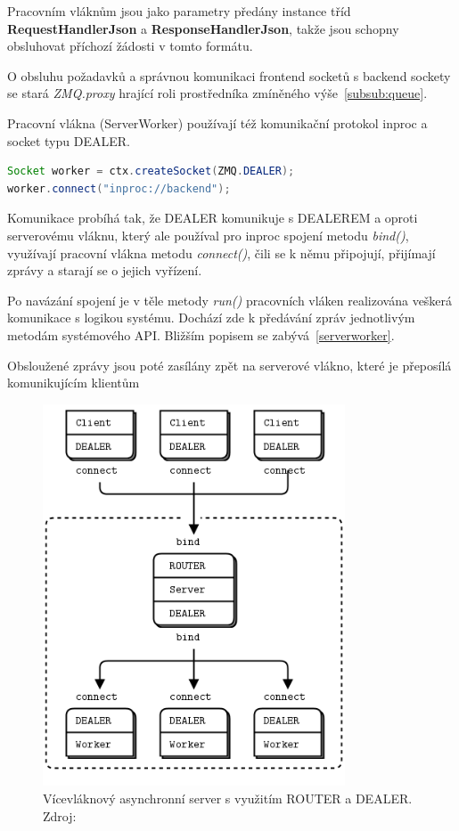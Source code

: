 \documentclass[thesis=M,czech]{FITthesis}[2014/05/07]
\begin{document}
Pracovním vláknům jsou jako parametry předány instance tříd \textbf{RequestHandlerJson} a \textbf{ResponseHandlerJson}, takže jsou schopny obsluhovat příchozí žádosti v tomto formátu.

O obsluhu požadavků a správnou komunikaci frontend socketů s backend sockety se stará \emph{ZMQ.proxy} hrající roli prostředníka zmíněného výše~\ref{subsub:queue}.

Pracovní vlákna (ServerWorker) používají též komunikační protokol inproc a socket typu DEALER.

\begin{lstlisting}[language=java]
Socket worker = ctx.createSocket(ZMQ.DEALER);
worker.connect("inproc://backend");
\end{lstlisting}

Komunikace probíhá tak, že DEALER komunikuje s DEALEREM a oproti serverovému vláknu, který ale používal pro inproc spojení metodu \emph{bind()}, využívají pracovní vlákna metodu \emph{connect()}, čili se k němu připojují, přijímají zprávy a starají se o jejich vyřízení.

Po navázání spojení je v těle metody \emph{run()} pracovních vláken realizována veškerá komunikace s logikou systému. Dochází zde k předávání zpráv jednotlivým metodám systémového API. Bližším popisem se zabývá~\ref{serverworker}. 

Obsloužené zprávy jsou poté zasílány zpět na serverové vlákno, které je přeposílá komunikujícím klientům

\begin{figure}\centering
	\includegraphics[width=0.8\textwidth]{obr/multithreadingServer.png}
 	\caption[Vícevláknový asynchronní server s využitím ROUTER a DEALER.]{Vícevláknový asynchronní server s využitím ROUTER a DEALER. Zdroj: \cite{mtserver}}\label{fig:mtserver}
\end{figure}	
\end{document}
